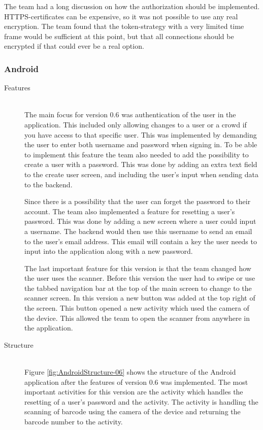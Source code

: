 The team had a long discussion on how the authorization should be implemented. \gls{HTTPS}-certificates can be expensive, so it was not possible to use any real encryption. The team found that the token-strategy with a very limited time frame would be sufficient at this point, but that all connections should be encrypted if that could ever be a real option.

\subsubsection{Android}
\begin{description}
    \item[Features] \hfill\\
    \label{para:androidFeature06}
The main focus for version 0.6 was authentication of the user in the application. This included only allowing changes to a user or a crowd if you have access to that specific user. This was implemented by demanding the user to enter both username and password when signing in. To be able to implement this feature the team also needed to add the possibility to create a user with a password. This was done by adding an extra text field to the create user screen, and including the user's input when sending data to the \gls{backend}. 

Since there is a possibility that the user can forget the password to their account. The team also implemented a feature for resetting a user's password. This was done by adding a new screen where a user could input a username. The \gls{backend} would then use this username to send an email to the user's email address. This email will contain a key the user needs to input into the application along with a new password. 

The last important feature for this version is that the team changed how the user uses the scanner. Before this version the user had to swipe or use the tabbed navigation bar at the top of the main screen to change to the scanner screen. In this version a new button was added at the top right of the screen. This button opened a new activity which used the camera of the device. This allowed the team to open the scanner from anywhere in the application. 

    \item[Structure] \hfill\\
Figure \ref{fig:AndroidStructure-06} shows the structure of the Android application after the features of version 0.6 was implemented. The most important activities for this version are the  activity which handles the resetting of a user's password and the  activity. The  activity is handling the scanning of barcode using the camera of the device and returning the barcode number to the  activity.


\end{description}
